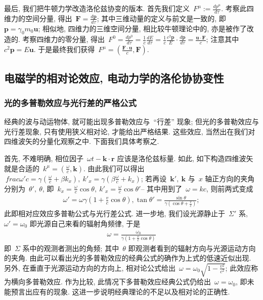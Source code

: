 最后, 我们把牛顿力学改造洛伦兹协变的版本. 首先我们定义~$F^\mu:=\frac{dp^\mu}{d\tau}$. 考察此四维力的空间分量, 得出~$\bm{F}=\frac{d\bm{p}}{d\tau}$; 其中三维动量的定义与前文是一致的, 即~$\bm{p}=\gamma_0m_0\bm{u}$; 相似地, 四维力的三维空间分量, 相比较牛顿理论中的, 亦是被作了改造的. 考察四维力的零分量, 得出~$F^0=\frac{dp^0}{d\tau}=\frac{1}{c}\frac{dE}{d\tau}=\frac{1}{c}\frac{c^2\bm{p}}{E}\cdot\frac{d\bm{p}}{d\tau}=\frac{\bm{u}\cdot\bm{F}}{c}$; 注意其中~$c^2\bm{p}=E\bm{u}$. 于是最终我们获得~$F^\mu=(\frac{\bm{F}\cdot\bm{u}}{c},\bm{F})$.






\subsection{电磁学的相对论效应, 电动力学的洛伦协协变性}
\subsubsection{光的多普勒效应与光行差的严格公式}
经典的波与动运物体, 就可能出现多普勒效应与~``行差'' 现象; 但光的多普勒效应与光行差现象, 只有使用狭义相对论, 才能给出严格结果. 这些效应, 当然出在我们对四维波矢的分量化观察之中. 下面我们具体考察之.

首先, 不难明确, 相位因子~$\omega t-\bm{k}\cdot\bm{r}$ 应该是洛伦兹标量. 如此, 如下构造四维波矢就是合适的~$k^\mu=(\frac{\omega}{c},\bm{k})$. 由此我们可以得出~$\ frac{\omega'}{c}=\gamma(\frac{\omega}{c}+\beta k_x),~k'_x=\gamma(\beta\frac{\omega}{c}+k_x)$; 若再设~$\bm{k}',~\bm{k}$ 与~$x$ 轴正方向的夹角分别为~$\theta',~\theta$, 即~$k_x=\frac{\omega}{c}\cos\theta,~k'_x=\frac{\omega}{c}\cos\theta'$-- 其中用到了~$\omega=kc$, 则前两式变成
\begin{gather}
\omega'=\omega\gamma\left(1+\frac{v}{c}\cos\theta\right),\tan\theta'=\frac{\sin\theta}{\gamma\left(\cos\theta+\frac{v}{c}\right)};
\end{gather}
此即相对应效应多普勒公式与光行差公式. 进一步地, 我们设光源静止于~$\Sigma'$ 系, $\omega'=\omega_0$ 即光源自己来看的辐射角频律, 于是
\begin{align}
\omega=\frac{\omega_0}{\gamma\left(1+\frac{v}{c}\cos\theta\right)}
\end{align}
即~$\Sigma$ 系中的观测者测出的角频; 其中~$\theta$ 即观测者看到的辐射方向与光源运动方向的夹角. 由此可以看出光的多普勒效应的经典公式的确作为上式的低速近似出现. 另外, 在垂直于光源运动方向的方向上, 相对论公式给出~$\omega=\omega_0\sqrt{1-\frac{v^2}{c^2}}$; 此效应称为横向多普勒效应. 作为比较, 此情况下多普勒效应经典公式仍给出~$\omega=\omega_0$, 即未能预言出应有的现象. 这进一步说明经典理论的不足以及相对论的正确性.










